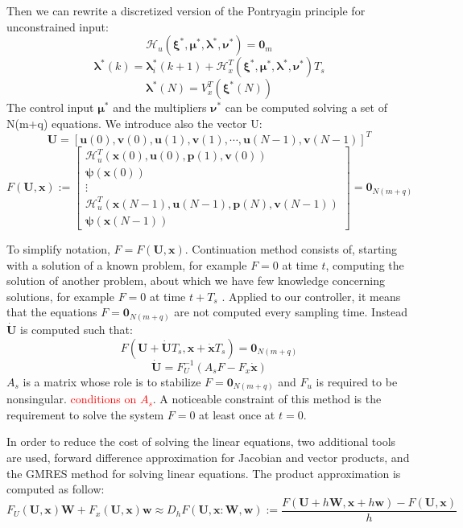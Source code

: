 \documentclass[a4paper, 12pt]{report}
\begin{document}
Then we can rewrite a discretized version of the Pontryagin principle for unconstrained input:
\[ \mathcal{H}_u(\boldsymbol{\xi}^*, \boldsymbol{\mu}^*, \boldsymbol{\lambda}^*, \boldsymbol{\nu}^*) = \boldsymbol{0}_m \]
\[ \boldsymbol{\lambda}^*(k)  = \boldsymbol{\lambda}_i^*(k+1) + \mathcal{H}_x^T(\boldsymbol{\xi}^*, \boldsymbol{\mu}^*, \boldsymbol{\lambda}^*, \boldsymbol{\nu}^*) T_s\]
\[ \boldsymbol{\lambda}^*(N) = V_x^T(\boldsymbol{\xi}^*(N)) \]
The control input $\boldsymbol{\mu}^*$ and the multipliers $\boldsymbol{\nu}^*$ can be computed solving a set of N(m+q) equations. We introduce also the vector U:
\[\boldsymbol{U} = [\boldsymbol{u}(0), \boldsymbol{v}(0), \boldsymbol{u}(1), \boldsymbol{v}(1), \cdots, \boldsymbol{u}(N-1), \boldsymbol{v}(N-1)]^T \]
\[F(\boldsymbol{U},\boldsymbol{x}) := \begin{bmatrix} \mathcal{H}_u^T(\boldsymbol{x}(0), \boldsymbol{u}(0), \boldsymbol{p}(1), \boldsymbol{v}(0)) \\ \boldsymbol{\psi}(\boldsymbol{x}(0)) \\ \vdots \\ \mathcal{H}^T_u (\boldsymbol{x}(N-1), \boldsymbol{u}(N-1), \boldsymbol{p}(N), \boldsymbol{v}(N-1)) \\ \boldsymbol{\psi}(\boldsymbol{x}(N-1))\end{bmatrix} = \boldsymbol{0}_{N(m+q)}\]

To simplify notation, $F = F(\boldsymbol{U},\boldsymbol{x})$. Continuation method consists of, starting with a solution of a known problem, for example $F = 0$ at time $t$, computing the solution of another problem, about which we have few knowledge concerning solutions, for example $F = 0$ at time $t + T_s$ \cite{Allgower1987}. Applied to our controller, it means that the equations $F = \boldsymbol{0}_{N(m+q)}$ are not computed every sampling time. Instead $\boldsymbol{\dot U}$ is computed such that:
\[ F(\boldsymbol{U} + \boldsymbol{\dot U}T_s,\boldsymbol{x} + \boldsymbol{\dot x} T_s) = \boldsymbol{0}_{N(m+q)} \]
\begin{equation}
\label{eq:dotUFromF}
\boldsymbol{\dot U} = F_U^{-1}(A_s F - F_x \boldsymbol{\dot x}) 
\end{equation}
$A_s$ is a matrix whose role is to stabilize $F = \boldsymbol{0}_{N(m+q)}$ and $F_u$ is required to be nonsingular. \textcolor{red}{conditions on $A_s$}. A noticeable constraint of this method is the requirement to solve the system $F=0$ at least once at $t=0$.

In order to reduce the cost of solving the linear equations, two additional tools are used, forward difference approximation for Jacobian and vector products, and the GMRES method for solving linear equations.
The product approximation is computed as follow:
\[ F_U(\boldsymbol{U}, \boldsymbol{x}) \boldsymbol{W} + F_x(\boldsymbol{U}, \boldsymbol{x}) \boldsymbol{w} \approx D_h F(\boldsymbol{U}, \boldsymbol{x} : \boldsymbol{W}, \boldsymbol{w}) := \frac{F(\boldsymbol{U} + h\boldsymbol{W}, \boldsymbol{x} + h\boldsymbol{w}) - F(\boldsymbol{U}, \boldsymbol{x})}{h} \]
\end{document}
